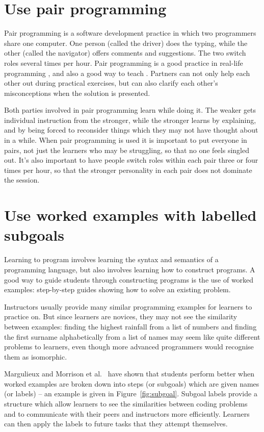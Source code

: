 \documentclass[10pt,letterpaper]{article}
\newcommand{\rulemajor}[2]{\section{#1}\label{#2}}
\newcommand{\evidence}[1]{}
\begin{document}
\rulemajor{Use pair programming}{pair-programming}
\evidence{High}

Pair programming is a software development practice
in which two programmers share one computer.
One person (called the driver) does the typing,
while the other (called the navigator) offers comments and suggestions.
The two switch roles several times per hour.
Pair programming is a good practice in real-life programming \cite{hannay},
and also a good way to teach \cite{mcdowell}.
Partners can not only help each other out during practical exercises,
but can also clarify each other's misconceptions when the solution is presented.

Both parties involved in pair programming learn while doing it.
The weaker gets individual instruction from the stronger,
while the stronger learns by explaining,
and by being forced to reconsider things which they may not have thought about in a while.
When pair programming is used it is important to put everyone in pairs,
not just the learners who may be struggling,
so that no one feels singled out.
It's also important to have people switch roles within each pair three or four times per hour,
so that the stronger personality in each pair does not dominate the session.

\rulemajor{Use worked examples with labelled subgoals}{worked-examples}
\evidence{High}

Learning to program involves learning the syntax and semantics of a programming language,
but also involves learning how to construct programs.
A good way to guide students through constructing programs is the use of worked examples:
step-by-step guides showing how to solve an existing problem.

Instructors usually provide many similar programming examples for learners to practice on.
But since learners are novices,
they may not see the similarity between examples:
finding the highest rainfall from a list of numbers and
finding the first surname alphabetically from a list of names
may seem like quite different problems to learners,
even though more advanced programmers would recognise them as isomorphic.

Margulieux and Morrison et al.~\cite{morrison-subgoals,morrison-parsons,margulieux} have shown that students perform better
when worked examples are broken down into steps (or subgoals)
which are given names (or labels) -- an example is given in Figure~\ref{fig:subgoal}.
Subgoal labels provide a structure which allow learners to see the similarities between coding problems and to communicate with their peers and instructors more efficiently.  Learners can then apply the labels to future tasks that they attempt themselves.
\end{document}
